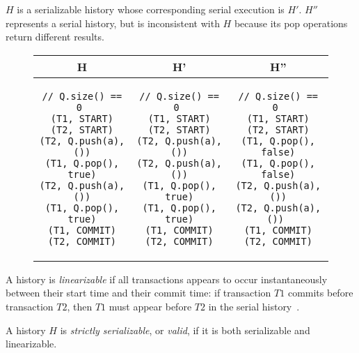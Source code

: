 \begin{eg}
    $H$ is a serializable history whose corresponding serial execution is $H'$. $H''$ represents a serial history, but is inconsistent with $H$ because its pop operations return different results.
\begin{figure}[H]
\singlespacing   
   \begin{tabular}{c|c|c}
H & H' & H''\\
\hline
\begin{lstlisting}
// Q.size() == 0 
(T1, START)
(T2, START)
(T2, Q.push(a), ())
(T1, Q.pop(), true)
(T2, Q.push(a), ())
(T1, Q.pop(), true)
(T1, COMMIT)
(T2, COMMIT)
\end{lstlisting} & 
\begin{lstlisting}
// Q.size() == 0 
(T1, START)
(T2, START)
(T2, Q.push(a), ())
(T2, Q.push(a), ())
(T1, Q.pop(), true)
(T1, Q.pop(), true)
(T1, COMMIT)
(T2, COMMIT)
\end{lstlisting} &
\begin{lstlisting}
// Q.size() == 0 
(T1, START)
(T2, START)
(T1, Q.pop(), false)
(T1, Q.pop(), false)
(T2, Q.push(a), ())
(T2, Q.push(a), ()) 
(T1, COMMIT)
(T2, COMMIT)
\end{lstlisting}
\end{tabular}
\end{figure}
\end{eg}

\begin{defn}
A history is \emph{linearizable} if all transactions appears to occur instantaneously between their start time and their commit time: if transaction $T1$ commits before transaction $T2$, then $T1$ must appear before $T2$ in the serial history~\cite{harristm}.
\end{defn}

\begin{defn}
    A history $H$ is \emph{strictly serializable}, or \emph{valid}, if it is both serializable and linearizable. 
\end{defn}


